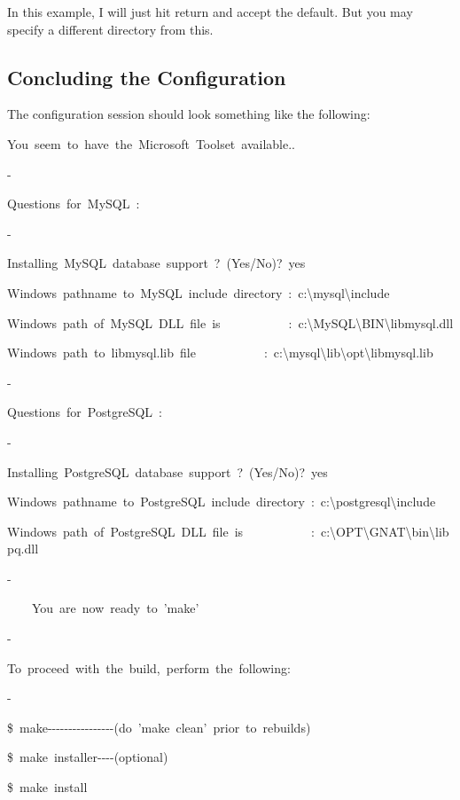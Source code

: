 \documentclass[english]{report}
\newenvironment{lyxcode}
   {\begin{list}{}{
     \setlength{\rightmargin}{\leftmargin}
     \setlength{\listparindent}{0pt}%
     \raggedright
     \setlength{\itemsep}{0pt}
     \setlength{\parsep}{0pt}
     \normalfont\ttfamily}%
    \item[]}
   {\end{list}}
\begin{document}
In this example, I will just hit return and accept the default. But
you may specify a different directory from this.


\subsection{Concluding the Configuration}

The configuration session should look something like the following: 

\begin{lyxcode}
{\footnotesize You~seem~to~have~the~Microsoft~Toolset~available..}{\footnotesize \par}

-

{\footnotesize Questions~for~MySQL~:}{\footnotesize \par}

-

{\footnotesize Installing~MySQL~database~support~?~(Yes/No)?~yes}{\footnotesize \par}

{\footnotesize Windows~pathname~to~MySQL~include~directory~:~c:\textbackslash{}mysql\textbackslash{}include}{\footnotesize \par}

{\footnotesize Windows~path~of~MySQL~DLL~file~is~~~~~~~~~~~:~c:\textbackslash{}MySQL\textbackslash{}BIN\textbackslash{}libmysql.dll}{\footnotesize \par}

{\footnotesize Windows~path~to~libmysql.lib~file~~~~~~~~~~~:~c:\textbackslash{}mysql\textbackslash{}lib\textbackslash{}opt\textbackslash{}libmysql.lib}{\footnotesize \par}

-

{\footnotesize Questions~for~PostgreSQL~:}{\footnotesize \par}

-

{\footnotesize Installing~PostgreSQL~database~support~?~(Yes/No)?~yes}{\footnotesize \par}

{\footnotesize Windows~pathname~to~PostgreSQL~include~directory~:~c:\textbackslash{}postgresql\textbackslash{}include}{\footnotesize \par}

{\footnotesize Windows~path~of~PostgreSQL~DLL~file~is~~~~~~~~~~~:~c:\textbackslash{}OPT\textbackslash{}GNAT\textbackslash{}bin\textbackslash{}libpq.dll}{\footnotesize \par}

-

~{\footnotesize ~~~You~are~now~ready~to~'make'}{\footnotesize \par}

-

To~proceed~with~the~build,~perform~the~following:

-

\$~make-{}-{}-{}-{}-{}-{}-{}-{}-{}-{}-{}-{}-{}-{}-{}-(do~'make~clean'~prior~to~rebuilds)

\$~make~installer-{}-{}-{}-(optional)

\$~make~install


\end{lyxcode}
\end{document}
